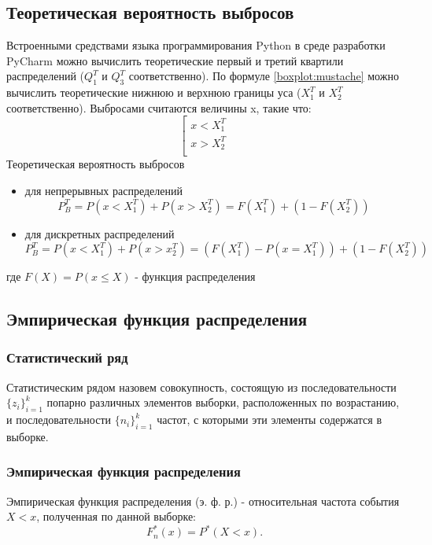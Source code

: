 \documentclass[a4paper]{article}
\begin{document}
\subsection{Теоретическая вероятность выбросов}
\noindent Встроенными средствами языка программирования Python в среде разработки PyCharm можно вычислить теоретические первый и третий квартили распределений ($Q_1^T$ и $Q_3^T$ соответственно). По формуле \eqref{boxplot:mustache} можно вычислить теоретические нижнюю и верхнюю границы уса ($X_1^T$ и $X_2^T$ соответственно). Выбросами считаются величины x, такие что: 
\begin{equation} \label{boxplot:emisssions}
	\left[
	\begin{gathered}
		x < X_1^T \\
		x > X_2^T \\
	\end{gathered}
	\right.
\end{equation}
Теоретическая вероятность выбросов 
\begin{itemize}
	\item для непрерывных распределений
	\begin{equation} \label{boxplot:emisProbContin}
		P_B^T = P(x<X_1^T) + P(x>X_2^T)=F(X_1^T) + (1-F(X_2^T))
	\end{equation}
	\item для дискретных распределений
	\begin{equation}\label{boxplot:emisProbDiscr}
		P_B^T = P(x<X_1^T)+P(x>x_2^T)=(F(X_1^T)-P(x=X_1^T))+(1-F(X_2^T))
	\end{equation}
\end{itemize}
где $F(X) = P(x\leq{X})$ - функция распределения

\subsection{Эмпирическая функция распределения}
\subsubsection{Статистический ряд}
\noindent Статистическим рядом назовем совокупность, состоящую из последовательности $\displaystyle\{z_i\}_{i=1}^k$ попарно различных элементов выборки, расположенных по возрастанию, и последовательности $\displaystyle\{n_i\}_{i=1}^k$ частот, с которыми эти элементы содержатся в выборке.
\subsubsection{Эмпирическая функция распределения}
\noindent Эмпирическая функция распределения (э. ф. р.) - относительная частота события $X < x$, полученная по данной выборке:
\begin{equation} \label{empiricalFunc}
	F_n^*(x)=P^*(X<x).
\end{equation}
\end{document}
